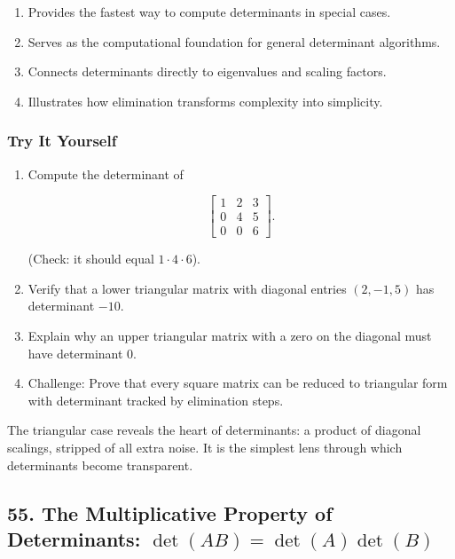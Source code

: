 \documentclass[
  letterpaper,
  DIV=11,
  numbers=noendperiod]{scrreprt}
\providecommand{\tightlist}{%
  \setlength{\itemsep}{0pt}\setlength{\parskip}{0pt}}
\begin{document}
\begin{enumerate}
\def\labelenumi{\arabic{enumi}.}
\tightlist
\item
  Provides the fastest way to compute determinants in special cases.
\item
  Serves as the computational foundation for general determinant
  algorithms.
\item
  Connects determinants directly to eigenvalues and scaling factors.
\item
  Illustrates how elimination transforms complexity into simplicity.
\end{enumerate}

\subsubsection{Try It Yourself}\label{try-it-yourself-53}

\begin{enumerate}
\def\labelenumi{\arabic{enumi}.}
\item
  Compute the determinant of

  \[
  \begin{bmatrix} 
  1 & 2 & 3 \\ 
  0 & 4 & 5 \\ 
  0 & 0 & 6 
  \end{bmatrix}.
  \]

  (Check: it should equal \(1 \cdot 4 \cdot 6\)).
\item
  Verify that a lower triangular matrix with diagonal entries
  \((2, -1, 5)\) has determinant \(-10\).
\item
  Explain why an upper triangular matrix with a zero on the diagonal
  must have determinant 0.
\item
  Challenge: Prove that every square matrix can be reduced to triangular
  form with determinant tracked by elimination steps.
\end{enumerate}

The triangular case reveals the heart of determinants: a product of
diagonal scalings, stripped of all extra noise. It is the simplest lens
through which determinants become transparent.

\subsection{\texorpdfstring{55. The Multiplicative Property of
Determinants:
\(\det(AB) = \det(A)\det(B)\)}{55. The Multiplicative Property of Determinants: \textbackslash det(AB) = \textbackslash det(A)\textbackslash det(B)}}\label{the-multiplicative-property-of-determinants-detab-detadetb}
\end{document}
